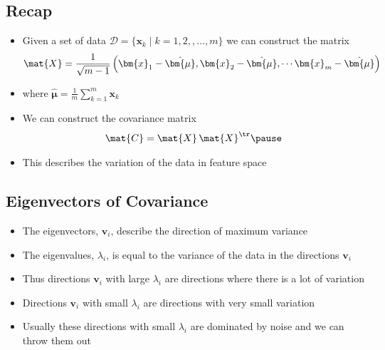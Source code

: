 \begin{slide}
\section{Recap}

\begin{PauseHighLight}
  \begin{itemize}
  \item Given a set of data
    $\mathcal{D}=\{\bm{x}_k\mid k=1,2,,\ldots,m\}$ we can construct the
    matrix
    \begin{align*}
      \mat{X} = \frac{1}{\sqrt{m-1}}\left( \strut \bm{x}_1-\hat{\bm{\mu}},
      \bm{x}_2-\hat{\bm{\mu}}, \cdots \bm{x}_m-\hat{\bm{\mu}} \right)
    \end{align*}
  \item where $\hat{\bm{\mu}} = \frac{1}{m} \sum\limits_{k=1}^m
    \bm{x}_k$\pause
  \item We can construct the covariance matrix
    \begin{align*}
      \mat{C} = \mat{X}\,\mat{X}^\tr\pause
    \end{align*}
  \item This describes the variation of the data in feature space\pause
  \end{itemize}
\end{PauseHighLight}

\end{slide}


\begin{slide}
\section{Eigenvectors of Covariance}

\begin{PauseHighLight}
  \begin{itemize}
  \item The eigenvectors, $\bm{v}_i$, describe the direction of maximum
    variance\pause
  \item The eigenvalues, $\lambda_i$, is equal to the variance of
    the data in the directions $\bm{v}_i$\pause
  \item Thus directions $\bm{v}_i$ with large $\lambda_i$ are directions
    where there is a lot of variation\pause
  \item Directions $\bm{v}_i$ with small $\lambda_i$ are directions with
    very small variation\pause
  \item Usually these directions with small $\lambda_i$ are dominated by
    noise and we can throw them out\pause
  \end{itemize}
\end{PauseHighLight}

\end{slide}

